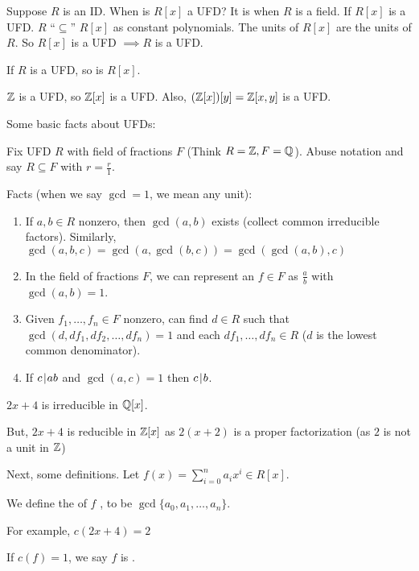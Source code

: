 \documentclass[notes.tex]{subfiles}
\begin{document}

Suppose $R$ is an ID. When is $R[x]$ a UFD?
It is when $R$ is a field. If $R[x]$ is a UFD. $R$ ``$\subseteq$'' $R[x]$ as constant polynomials. The units of $R[x]$ are the units of $R$. So $R[x]$ is a UFD $\implies R$ is a UFD.

\begin{theorem}
	If $R$ is a UFD, so is $R[x]$.
\end{theorem}
\begin{corollary}
	$\mathbb{Z}$ is a UFD, so $\mathbb{Z}[x]$ is a UFD.
	Also, $(\mathbb{Z}[x])[y] = \mathbb{Z}[x, y]$ is a UFD.
\end{corollary}

Some basic facts about UFDs:

Fix UFD $R$ with field of fractions $F$ (Think $R= \mathbb{Z}, F=\mathbb{Q}$). Abuse notation and say $R\subseteq F$ with $r = \frac{r}{1}$.

Facts (when we say $\gcd = 1$, we mean any unit):
\begin{enumerate}
	\item If $a, b\in R$ nonzero, then $\gcd(a,b)$ exists (collect common irreducible factors).
	Similarly, $\gcd(a,b,c) = \gcd(a, \gcd(b,c)) = \gcd (\gcd(a,b), c)$
	\item In the field of fractions $F$, we can represent an $f\in F$ as $\frac{a}{b}$ with $\gcd(a,b) = 1$.
	\item Given $f_1, \ldots, f_n\in F$ nonzero, can find $d\in R$ such that $\gcd(d, df_1, df_2, \ldots, df_n) = 1$ and each $df_1, \ldots, df_n\in R$ ($d$ is the lowest common denominator).
	\item If $c\mkern2mu|\mkern1mu ab$ and $\gcd(a,c) = 1$ then $c\mkern2mu|\mkern1mu b$.
\end{enumerate}

\begin{eg} 
	$2x+4$ is irreducible in $\mathbb{Q}[x]$.

	But, $2x+4$ is reducible in $\mathbb{Z}[x]$ as $2(x+2)$ is a proper factorization (as $2$ is not a unit in $\mathbb{Z}$)
\end{eg}

Next, some definitions. Let $f(x) = \sum^n_{i=0} a_ix^i\in R[x]$.
\begin{defn}
	We define the  of $f$ , to be $\gcd\{a_0, a_1, \ldots, a_n\}$.

	For example, $c(2x+4) = 2$
\end{defn}
\begin{defn}
	If $c(f) = 1$, we say $f$ is .
\end{defn}
\end{document}
